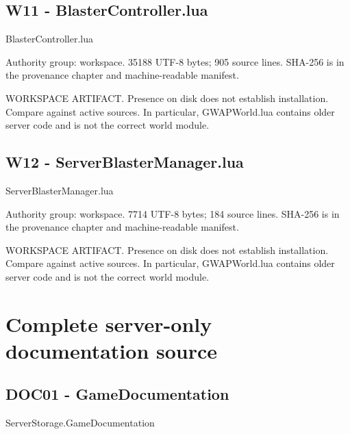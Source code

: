 \chapter{W11 - BlasterController.\allowbreak{}lua}
\label{src:W11}
BlasterController.\allowbreak{}lua

Authority group: workspace.\allowbreak{} 35188 UTF-8 bytes; 905 source lines.\allowbreak{} SHA-256 is in the provenance chapter and machine-readable manifest.\allowbreak{}

WORKSPACE ARTIFACT.\allowbreak{} Presence on disk does not establish installation.\allowbreak{} Compare against active sources.\allowbreak{} In particular, GWAPWorld.\allowbreak{}lua contains older server code and is not the correct world module.\allowbreak{}

\begingroup{}
\endgroup
\chapter{W12 - ServerBlasterManager.\allowbreak{}lua}
\label{src:W12}
ServerBlasterManager.\allowbreak{}lua

Authority group: workspace.\allowbreak{} 7714 UTF-8 bytes; 184 source lines.\allowbreak{} SHA-256 is in the provenance chapter and machine-readable manifest.\allowbreak{}

WORKSPACE ARTIFACT.\allowbreak{} Presence on disk does not establish installation.\allowbreak{} Compare against active sources.\allowbreak{} In particular, GWAPWorld.\allowbreak{}lua contains older server code and is not the correct world module.\allowbreak{}

\begingroup{}
\endgroup
\part{Complete server-only documentation source}
\chapter{DOC01 - GameDocumentation}
\label{src:DOC01}
ServerStorage.\allowbreak{}GameDocumentation

